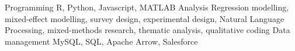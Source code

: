 


\begin{cvskills}
    \cvskill
        {Programming}
        {R, Python, Javascript, MATLAB}
    \cvskill
        {Analysis}
        {Regression modelling, mixed-effect modelling, survey design, experimental design, Natural Language Processing, mixed-methods research, thematic analysis, qualitative coding}
    \cvskill
        {Data management}
        {MySQL, SQL, Apache Arrow, Salesforce}

\end{cvskills}

